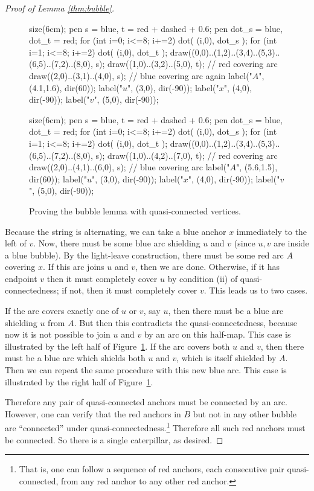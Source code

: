 \begin{proof}[Proof of Lemma \ref{thm:bubble}]
	\begin{figure}[ht]
		\centering
		\begin{asy}
			size(6cm);
			pen s = blue, t = red + dashed + 0.6;
			pen dot_s = blue, dot_t = red;
			for (int i=0; i<=8; i+=2) { dot( (i,0), dot_s ); }
			for (int i=1; i<=8; i+=2) { dot( (i,0), dot_t ); }
			draw((0,0)..(1,2)..(3,4)..(5,3)..(6,5)..(7,2)..(8,0), s);
			draw((1,0)..(3,2)..(5,0), t); // red covering arc
			draw((2,0)..(3,1)..(4,0), s); // blue covering arc again
			label("$A$", (4.1,1.6), dir(60));
			label("$u$", (3,0), dir(-90));
			label("$x$", (4,0), dir(-90));
			label("$v$", (5,0), dir(-90));
		\end{asy}
		\hspace{2em}
		\begin{asy}
			size(6cm);
			pen s = blue, t = red + dashed + 0.6;
			pen dot_s = blue, dot_t = red;
			for (int i=0; i<=8; i+=2) { dot( (i,0), dot_s ); }
			for (int i=1; i<=8; i+=2) { dot( (i,0), dot_t ); }
			draw((0,0)..(1,2)..(3,4)..(5,3)..(6,5)..(7,2)..(8,0), s);
			draw((1,0)..(4,2)..(7,0), t); // red covering arc
			draw((2,0)..(4,1)..(6,0), s); // blue covering arc
			label("$A$", (5.6,1.5), dir(60));
			label("$u$", (3,0), dir(-90));
			label("$x$", (4,0), dir(-90));
			label("$v$", (5,0), dir(-90));
		\end{asy}
		\caption{Proving the bubble lemma with quasi-connected vertices.}
		\label{fig:pf_bubble}
	\end{figure}
	Because the string is alternating, we can take a blue anchor $x$ immediately to the left of $v$.  Now, there must be some blue arc shielding $u$ and $v$ (since $u,v$ are inside a blue bubble).  By the light-leave construction, there must be some red arc $A$ covering $x$.  If this arc joins $u$ and $v$, then we are done.  
	Otherwise, if it has endpoint $v$ then it must completely cover $u$ by condition (ii) of quasi-connectedness; if not, then it must completely cover $v$.  This leads us to two cases.
	\begin{itemize}
		\ii If the arc covers exactly one of $u$ or $v$, say $u$, then there must be a blue arc shielding $u$ from $A$.  But then this contradicts the quasi-connectedness, because now it is not possible to join $u$ and $v$ by an arc on this half-map.  This case is illustrated by the left half of Figure~\ref{fig:pf_bubble}.
		\ii If the arc covers both $u$ and $v$, then there must be a blue arc which shields both $u$ and $v$, which is itself shielded by $A$.  Then we can repeat the same procedure with this new blue arc.  This case is illustrated by the right half of Figure~\ref{fig:pf_bubble}.
	\end{itemize}
	Therefore any pair of quasi-connected anchors must be connected by an arc.  However, one can verify that the red anchors in $B$ but not in any other bubble are ``connected'' under quasi-connectedness.\footnote{That is, one can follow a sequence of red anchors, each consecutive pair quasi-connected, from any red anchor to any other red anchor.}  Therefore all such red anchors must be connected.  So there is a single caterpillar, as desired.
\end{proof}

